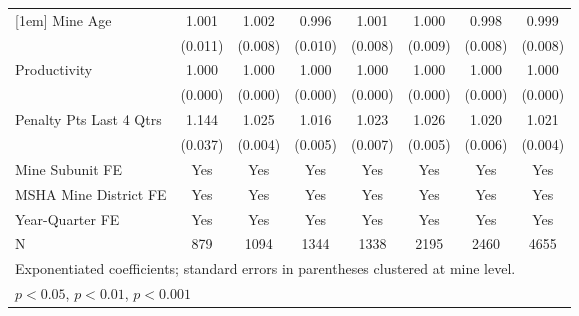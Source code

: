 {\begin{tabular}{l*{7}{c}}
[1em]
Mine Age                 &       1.001         &       1.002         &       0.996         &       1.001         &       1.000         &       0.998         &       0.999         \\
                         &     (0.011)         &     (0.008)         &     (0.010)         &     (0.008)         &     (0.009)         &     (0.008)         &     (0.008)         \\
[1em]
Productivity             &       1.000         &       1.000         &       1.000         &       1.000         &       1.000         &       1.000         &       1.000         \\
                         &     (0.000)         &     (0.000)         &     (0.000)         &     (0.000)         &     (0.000)         &     (0.000)         &     (0.000)         \\
[1em]
Penalty Pts Last 4 Qtrs  &       1.144\sym{***}&       1.025\sym{***}&       1.016\sym{**} &       1.023\sym{***}&       1.026\sym{***}&       1.020\sym{***}&       1.021\sym{***}\\
                         &     (0.037)         &     (0.004)         &     (0.005)         &     (0.007)         &     (0.005)         &     (0.006)         &     (0.004)         \\
[1em]
Mine Subunit FE          &         Yes         &         Yes         &         Yes         &         Yes         &         Yes         &         Yes         &         Yes         \\
[1em]
MSHA Mine District FE    &         Yes         &         Yes         &         Yes         &         Yes         &         Yes         &         Yes         &         Yes         \\
[1em]
Year-Quarter FE          &         Yes         &         Yes         &         Yes         &         Yes         &         Yes         &         Yes         &         Yes         \\
\hline
N                        &         879         &        1094         &        1344         &        1338         &        2195         &        2460         &        4655         \\
\hline\hline
\multicolumn{8}{l}{\footnotesize Exponentiated coefficients; standard errors in parentheses clustered at mine level.}\\
\multicolumn{8}{l}{\footnotesize \sym{*} \(p<0.05\), \sym{**} \(p<0.01\), \sym{***} \(p<0.001\)}\\
\end{tabular}
}
